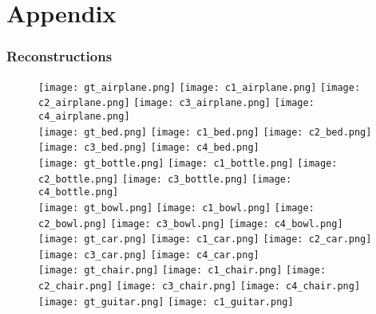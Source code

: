 \chapter{Appendix}
\label{sec:appendix}

\subsection*{Reconstructions}
\label{optrecon}

\begin{figure}[htbp]
    \centering
    \texttt{[image: gt\_airplane.png]}
    \texttt{[image: c1\_airplane.png]}
    \texttt{[image: c2\_airplane.png]}
    \texttt{[image: c3\_airplane.png]}
    \texttt{[image: c4\_airplane.png]}\\
    \texttt{[image: gt\_bed.png]}
    \texttt{[image: c1\_bed.png]}
    \texttt{[image: c2\_bed.png]}
    \texttt{[image: c3\_bed.png]}
    \texttt{[image: c4\_bed.png]}\\
    \texttt{[image: gt\_bottle.png]}
    \texttt{[image: c1\_bottle.png]}
    \texttt{[image: c2\_bottle.png]}
    \texttt{[image: c3\_bottle.png]}
    \texttt{[image: c4\_bottle.png]}\\
    \texttt{[image: gt\_bowl.png]}
    \texttt{[image: c1\_bowl.png]}
    \texttt{[image: c2\_bowl.png]}
    \texttt{[image: c3\_bowl.png]}
    \texttt{[image: c4\_bowl.png]}\\
    \texttt{[image: gt\_car.png]}
    \texttt{[image: c1\_car.png]}
    \texttt{[image: c2\_car.png]}
    \texttt{[image: c3\_car.png]}
    \texttt{[image: c4\_car.png]}\\
    \texttt{[image: gt\_chair.png]}
    \texttt{[image: c1\_chair.png]}
    \texttt{[image: c2\_chair.png]}
    \texttt{[image: c3\_chair.png]}
    \texttt{[image: c4\_chair.png]}\\
    \texttt{[image: gt\_guitar.png]}
    \texttt{[image: c1\_guitar.png]}

\end{figure}
